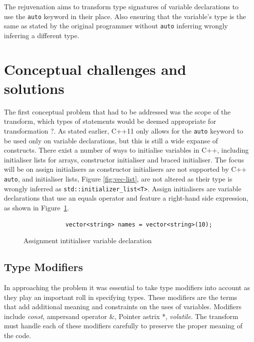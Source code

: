 \documentclass[bsc,frontabs,singlespacing,twoside,parskip,deptreport]{infthesis}
\begin{document}
The rejuvenation aims to transform type signatures of variable declarations to use the \texttt{auto} keyword in their place. Also ensuring that the variable's type is the same as stated by the original programmer without \texttt{auto} inferring wrongly inferring a different type.


\section{Conceptual challenges and solutions}
The first conceptual problem that had to be addressed was the scope of the transform, which types of statements would be deemed appropriate for transformation ?. As stated earlier, C++11 only allows for the \texttt{auto} keyword to be used only on variable declarations, but this is still a wide expanse of constructs. There exist a number of ways to initialise variables in C++, including initialiser lists for arrays, constructor initialiser and braced initialiser. The focus will be on assign initialisers as constructor initialisers are not supported by C++ \texttt{auto}, and initialiser lists, Figure \ref{fig:vec-list}, are not altered as their type is wrongly inferred as \texttt{std::initializer\_list<T>}. Assign initialisers are variable declarations that use an equals operator and feature a right-hand side expression, as shown in Figure~\ref{fig:ass-var}.

\begin{figure}[!h]
    \begin{verbatim}
            vector<string> names = vector<string>(10);
    \end{verbatim}
    \caption{Assignment intitialiser variable declaration}
    \label{fig:ass-var}
\end{figure}

\subsection{Type Modifiers}
In approaching the problem it was essential to take type modifiers into account as they play an important roll in specifying types. These modifiers are the terms that add additional meaning and constraints on the uses of variables. Modifiers include \textit{const}, ampersand operator \&, Pointer astrix *, \textit{volatile}. The transform must handle each of these modifiers carefully to preserve the proper meaning of the code. 
\end{document}
